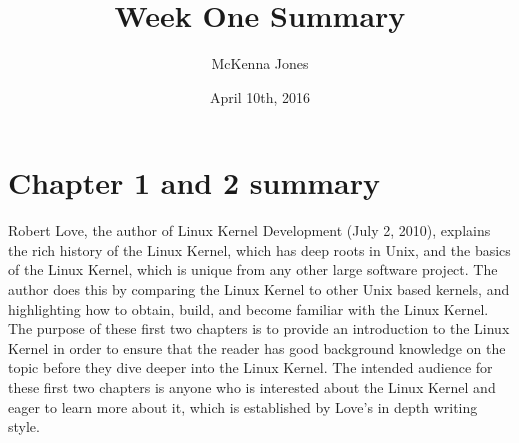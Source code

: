 \documentclass[letterpaper,10pt]{article}
\title{Week One Summary}
\author{McKenna Jones}
\date{April 10th, 2016}
\begin{document}
\begin{titlepage}
\maketitle
\end{titlepage}

\section{Chapter 1 and 2 summary}
Robert Love, the author of Linux Kernel Development (July 2, 2010), explains the rich history of the Linux Kernel, which has deep roots in Unix, and the basics of the Linux Kernel, which is unique from any other large software project. The author does this by comparing the Linux Kernel to other Unix based kernels, and highlighting how to obtain, build, and become familiar with the Linux Kernel. The purpose of these first two chapters is to provide an introduction to the Linux Kernel in order to ensure that the reader has good background knowledge on the topic before they dive deeper into the Linux Kernel. The intended audience for these first two chapters is anyone who is interested about the Linux Kernel and eager to learn more about it, which is established by Love's in depth writing style.
\end{document}
